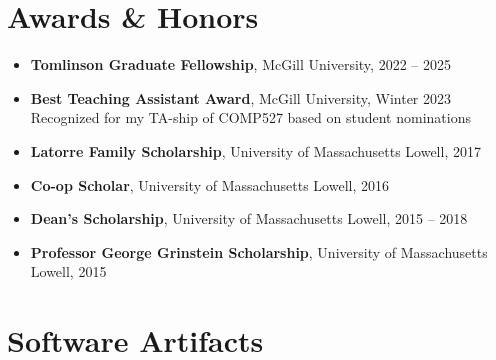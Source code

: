 \documentclass[11pt]{article}
\begin{document}
\section*{Awards \& Honors}
\begin{itemize}[leftmargin=*]
    \item \textbf{Tomlinson Graduate Fellowship}, McGill University, 2022 -- 2025
    \item \textbf{Best Teaching Assistant Award}, McGill University, Winter 2023 \\
    Recognized for my TA-ship of COMP527 based on student nominations
  \item \textbf{Latorre Family Scholarship}, University of Massachusetts Lowell, 2017
  \item \textbf{Co-op Scholar}, University of Massachusetts Lowell, 2016
  \item \textbf{Dean's Scholarship}, University of Massachusetts Lowell, 2015 -- 2018
  \item \textbf{Professor George Grinstein Scholarship}, University of Massachusetts Lowell, 2015
\end{itemize}

\section*{Software Artifacts}
\nocite{*}
\printbibliography[heading=none, type=software, resetnumbers=true]
\end{document}
